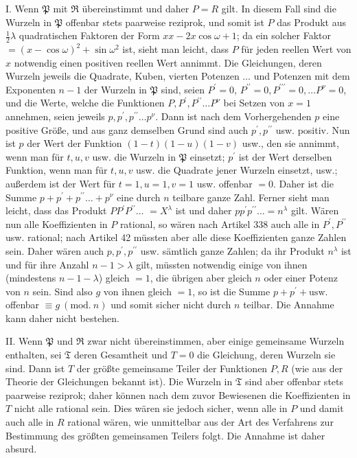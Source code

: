 I. Wenn \(\mathfrak P\) mit \(\mathfrak R\) übereinstimmt und daher \(P=R\) gilt. In diesem Fall sind die Wurzeln in \(\mathfrak P\) offenbar stets paarweise reziprok, und somit ist \(P\) das Produkt aus \(\frac12\lambda\) quadratischen Faktoren der Form \(xx-2x\cos\omega+1\); da ein solcher Faktor \(=(x-\cos\omega)^2+\sin\omega^2\) ist, sieht man leicht, dass \(P\) für jeden reellen Wert von \(x\) notwendig einen positiven reellen Wert annimmt. Die Gleichungen, deren Wurzeln jeweils die Quadrate, Kuben, vierten Potenzen \(\ldots\) und Potenzen mit dem Exponenten \(n-1\) der Wurzeln in \(\mathfrak P\) sind, seien \(P^{\prime}=0\), \(P^{\prime\prime}=0,\allowbreak P^{\prime\prime\prime}=0,\allowbreak \ldots P^\nu=0\), und die Werte, welche die Funktionen \(P,\allowbreak P^{\prime},\allowbreak P^{\prime\prime}\ldots P^\nu\) bei Setzen von \(x=1\) annehmen, seien jeweils \(p,\allowbreak p^{\prime},\allowbreak p^{\prime\prime}\ldots p^\nu\). Dann ist nach dem Vorhergehenden \(p\) eine positive Größe, und aus ganz demselben Grund sind auch \(p^{\prime},\allowbreak p^{\prime\prime}\) usw. positiv. Nun ist \(p\) der Wert der Funktion \((1-t)(1-u)(1-v)\) usw., den sie annimmt, wenn man für \(t,\allowbreak u,\allowbreak v\) usw. die Wurzeln in \(\mathfrak P\) einsetzt; \(p^{\prime}\) ist der Wert derselben Funktion, wenn man für \(t,\allowbreak u,\allowbreak v\) usw. die Quadrate jener Wurzeln einsetzt, usw.; außerdem ist der Wert für \(t=1,\allowbreak u=1,\allowbreak v=1\) usw. offenbar \(=0\). Daher ist die Summe \(p+p^{\prime}+p^{\prime\prime}\ldots+p^\nu\) eine durch \(n\) teilbare ganze Zahl. Ferner sieht man leicht, dass das Produkt \(PP^{\prime} P^{\prime\prime}\ldots\) \(=X^\lambda\) ist und daher \(pp^{\prime} p^{\prime\prime}\ldots=n^\lambda\) gilt. Wären nun alle Koeffizienten in \(P\) rational, so wären nach Artikel 338 auch alle in \(P^{\prime},\allowbreak P^{\prime\prime}\) usw. rational; nach Artikel 42 müssten aber alle diese Koeffizienten ganze Zahlen sein. Daher wären auch \(p,\allowbreak p^{\prime},\allowbreak p^{\prime\prime}\) usw. sämtlich ganze Zahlen; da ihr Produkt \(n^\lambda\) ist und für ihre Anzahl \(n-1>\lambda\) gilt, müssten notwendig einige von ihnen (mindestens \(n-1-\lambda\)) gleich \(=1\), die übrigen aber gleich \(n\) oder einer Potenz von \(n\) sein. Sind also \(g\) von ihnen gleich \(=1\), so ist die Summe \(p+p^{\prime}+\mathrm{usw.}\) offenbar \(\equiv g\ (\mathrm{mod.}\ n)\) und somit sicher nicht durch \(n\) teilbar. Die Annahme kann daher nicht bestehen.

II. Wenn \(\mathfrak P\) und \(\mathfrak R\) zwar nicht übereinstimmen, aber einige gemeinsame Wurzeln enthalten, sei \(\mathfrak T\) deren Gesamtheit und \(T=0\) die Gleichung, deren Wurzeln sie sind. Dann ist \(T\) der größte gemeinsame Teiler der Funktionen \(P,\allowbreak R\) (wie aus der Theorie der Gleichungen bekannt ist). Die Wurzeln in \(\mathfrak T\) sind aber offenbar stets paarweise reziprok; daher können nach dem zuvor Bewiesenen die Koeffizienten in \(T\) nicht alle rational sein. Dies wären sie jedoch sicher, wenn alle in \(P\) und damit auch alle in \(R\) rational wären, wie unmittelbar aus der Art des Verfahrens zur Bestimmung des größten gemeinsamen Teilers folgt. Die Annahme ist daher absurd.

